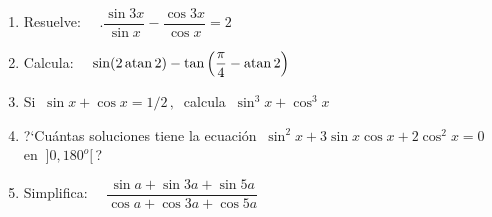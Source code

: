 \begin{enumerate}
\item	Resuelve: $\quad. \dfrac{\sin 3x}{\sin x}-\dfrac{\cos 3x}{\cos x}=2$

\vspace{-6mm}
\begin{flushright}
\begin{footnotesize} \textcolor{gris}{}	\end{footnotesize}
\end{flushright}


\item	Calcula: $\quad \sin(2\atan 2)-\tan \left( \dfrac \pi 4 - \atan 2 \right)$

\vspace{-6mm}
\begin{flushright}
\begin{footnotesize} \textcolor{gris}{}	\end{footnotesize}
\end{flushright}


\item	Si $\ \sin x+\cos x=1/2\, , \ $ calcula $\ \sin^3 x+\cos^3 x$

\vspace{-12mm}
\begin{flushright}
\begin{footnotesize} \textcolor{gris}{}	\end{footnotesize}
\end{flushright}



\item	?`Cuántas soluciones tiene la ecuación $\ \sin^2 x+3\sin x \cos x+2\cos^2 x=0\, \ $ en $\ ]0,180^o[\, $?

\vspace{-6mm}
\begin{flushright}
\begin{footnotesize} \textcolor{gris}{}	\end{footnotesize}
\end{flushright}

\item	Simplifica: $\quad \dfrac{\sin a+ \sin 3a+ \sin 5a}{\cos a+ \cos 3a+\cos 5a}$

\vspace{-6mm}
\begin{flushright}
\begin{footnotesize} \textcolor{gris}{}	\end{footnotesize}
\end{flushright}



\end{enumerate}


